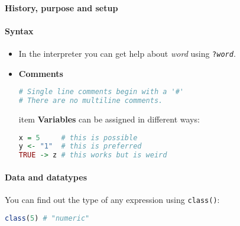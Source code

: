 \paragraph{History, purpose and setup}

\paragraph{Syntax}
\begin{itemize}
\item In the interpreter you can get help about \textit{word} using \texttt{?\textit{word}}.
\item \textbf{Comments}
\begin{lstlisting}[language={r}, style=snippet]
# Single line comments begin with a '#'
# There are no multiline comments.
\end{lstlisting}
item \textbf{Variables} can be assigned in different ways:
\begin{lstlisting}[language={r}, style=snippet]
x = 5     # this is possible
y <- "1"  # this is preferred
TRUE -> z # this works but is weird
\end{lstlisting}
\end{itemize}

\paragraph{Data and datatypes}
You can find out the type of any expression using \texttt{class()}:
\begin{lstlisting}[language={r}, style=snippet]
class(5) # "numeric"
\end{lstlisting}

